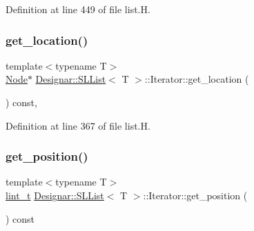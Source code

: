 Definition at line 449 of file list.\+H.

\mbox{\label{class_designar_1_1_s_l_list_1_1_iterator_af994c3d4b1f178e55d8b68d3b7a515cf}} 
\subsubsection{\texorpdfstring{get\+\_\+location()}{get\_location()}}
{\footnotesize\ttfamily template$<$typename T$>$ \\
\hyperlink{class_designar_1_1_node_s_l_list_a41963019ada1025099e3259207a3de96}{Node}$\ast$ \hyperlink{class_designar_1_1_s_l_list}{Designar\+::\+S\+L\+List}$<$ T $>$\+::Iterator\+::get\+\_\+location (\begin{DoxyParamCaption}{ }\end{DoxyParamCaption}) const\hspace{0.3cm}{\ttfamily [inline]}, {\ttfamily [protected]}}



Definition at line 367 of file list.\+H.

\mbox{\label{class_designar_1_1_s_l_list_1_1_iterator_a2105a92f98b381c1dc9cdc138e96a22a}} 
\subsubsection{\texorpdfstring{get\+\_\+position()}{get\_position()}}
{\footnotesize\ttfamily template$<$typename T$>$ \\
\hyperlink{namespace_designar_a9d113d66a39e82b73727c72cd3a52f73}{lint\+\_\+t} \hyperlink{class_designar_1_1_s_l_list}{Designar\+::\+S\+L\+List}$<$ T $>$\+::Iterator\+::get\+\_\+position (\begin{DoxyParamCaption}{ }\end{DoxyParamCaption}) const\hspace{0.3cm}{\ttfamily [inline]}}



